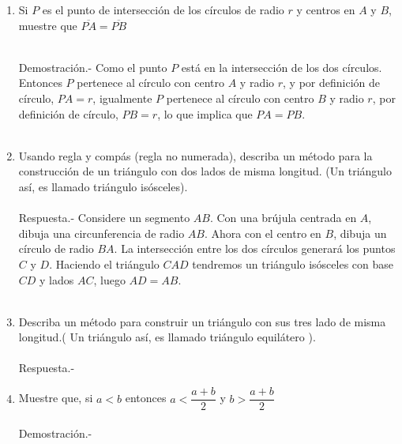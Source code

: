 \documentclass[10pt]{article}
\begin{document}
\begin{enumerate}
	\item Si $P$ es el punto de intersección de los círculos de radio $r$ y centros en $A$ y $B$, muestre que $\overline{PA}=\overline{PB}$\\\\
	\begin{center}
	\end{center}
	Demostración.-\; Como el punto $P$ está en la intersección de los dos círculos. Entonces $P$ pertenece al círculo con centro $A$ y radio $r$, y por definición de círculo, $PA = r$, igualmente $P$ pertenece al círculo con centro $B$ y radio $r$, por definición de círculo, $PB = r$, lo que implica que $PA = PB$.\\\\

	\item Usando regla y compás (regla no numerada), describa un método para la construcción de un triángulo con dos lados de misma longitud. (Un triángulo así, es llamado triángulo isósceles).\\\\
	Respuesta.-\; Considere un segmento $AB$. Con una brújula centrada en $A$, dibuja una circunferencia de radio $AB$. Ahora con el centro en $B$, dibuja un círculo de radio $BA$. La intersección entre los dos círculos generará los puntos $C$ y $D$. Haciendo el triángulo $CAD$ tendremos un triángulo isósceles con base $CD$ y lados $AC$, luego $AD = AB$.\\\\

	\item Describa un método para construir un triángulo con sus tres lado de misma longitud.( Un triángulo así, es llamado triángulo equilátero ).\\\\
	Respuesta.-\;

	\item Muestre que, si $a<b$ entonces $a<\dfrac{a+b}{2}$ y $b>\dfrac{a+b}{2}$\\\\
	Demostración.-\;


\end{enumerate}
\end{document}
